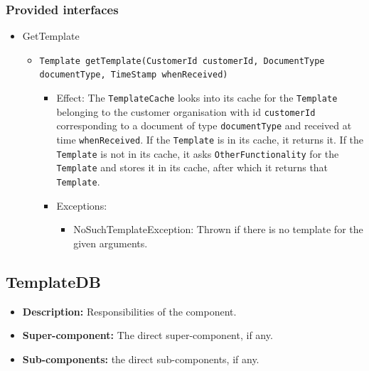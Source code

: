 \documentclass[a4paper,10pt]{article}
\begin{document}
\subsubsection*{Provided interfaces}
\begin{itemize}
	\item GetTemplate
    \begin{itemize}
    
   		\item \texttt{Template getTemplate(CustomerId customerId, DocumentType documentType, TimeStamp whenReceived)}
        \begin{itemize}
            \item Effect:  The \texttt{TemplateCache} looks into its cache for the \texttt{Template} belonging to the customer organisation with id \texttt{customerId} corresponding to a document of type \texttt{documentType} and received at time \texttt{whenReceived}. If the \texttt{Template} is in its cache, it returns it. If the \texttt{Template} is not in its cache, it asks \texttt{OtherFunctionality} for the \texttt{Template} and stores it in its cache, after which it returns that \texttt{Template}.
            \item Exceptions:
            \begin{itemize}
                \item NoSuchTemplateException: Thrown if there is no template for the given arguments.
            \end{itemize}
        \end{itemize}
    \end{itemize}
\end{itemize}

\subsection{TemplateDB}
\begin{itemize}
    \item \textbf{Description:} Responsibilities of the component.
    \item \textbf{Super-component:} The direct super-component, if any.
    \item \textbf{Sub-components:} the direct sub-components, if any.
\end{itemize}
\end{document}
